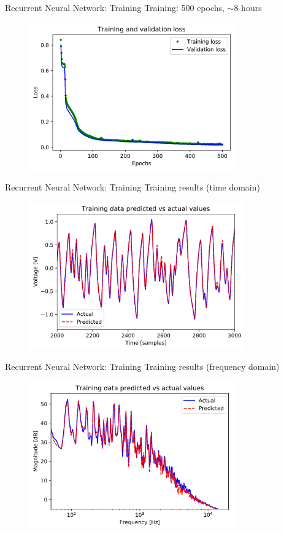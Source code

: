 \begin{frame}{Recurrent Neural Network: Training}
    Training: 500 epochs, $\sim 8$ hours
    \begin{figure}
        \centering
        \includegraphics[height=2.5in]{../Paper/Figures/Training.png}
    \end{figure}
\end{frame}

\begin{frame}{Recurrent Neural Network: Training}
    Training results (time domain)
    \begin{figure}
        \centering
        \includegraphics[height=2.5in]{../Paper/Figures/TimeDomain.png}
    \end{figure}
\end{frame}

\begin{frame}{Recurrent Neural Network: Training}
    Training results (frequency domain)
    \begin{figure}
        \centering
        \includegraphics[height=2.5in]{../Paper/Figures/FreqDomain.png}
    \end{figure}
\end{frame}
